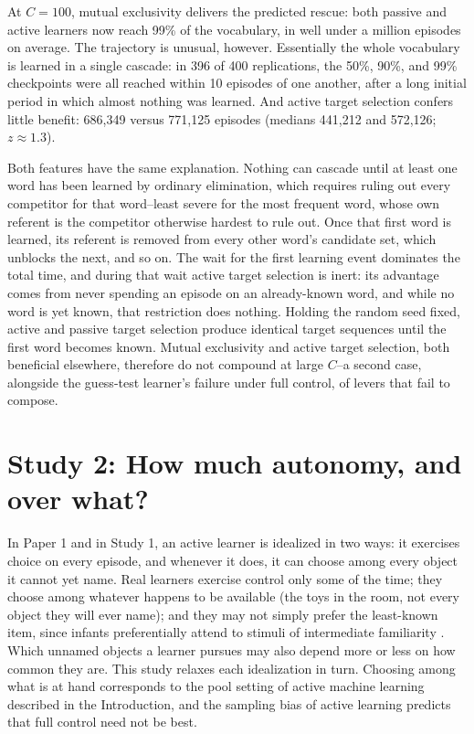 \documentclass[a4paper,natbib,man]{apa6}
\begin{document}
At $C=100$, mutual exclusivity delivers the predicted rescue: both passive and active learners now reach 99\% of the vocabulary, in well under a million episodes on average. The trajectory is unusual, however. Essentially the whole vocabulary is learned in a single cascade: in 396 of 400 replications, the 50\%, 90\%, and 99\% checkpoints were all reached within 10 episodes of one another, after a long initial period in which almost nothing was learned. And active target selection confers little benefit: 686,349 versus 771,125 episodes (medians 441,212 and 572,126; $z \approx 1.3$).

Both features have the same explanation. Nothing can cascade until at least one word has been learned by ordinary elimination, which requires ruling out every competitor for that word--least severe for the most frequent word, whose own referent is the competitor otherwise hardest to rule out. Once that first word is learned, its referent is removed from every other word's candidate set, which unblocks the next, and so on. The wait for the first learning event dominates the total time, and during that wait active target selection is inert: its advantage comes from never spending an episode on an already-known word, and while no word is yet known, that restriction does nothing. Holding the random seed fixed, active and passive target selection produce identical target sequences until the first word becomes known. Mutual exclusivity and active target selection, both beneficial elsewhere, therefore do not compound at large $C$--a second case, alongside the guess-test learner's failure under full control, of levers that fail to compose.

\section{Study 2: How much autonomy, and over what?}
\label{sec-modes}

In Paper 1 and in Study 1, an active learner is idealized in two ways: it exercises choice on every episode, and whenever it does, it can choose among every object it cannot yet name. Real learners exercise control only some of the time; they choose among whatever happens to be available (the toys in the room, not every object they will ever name); and they may not simply prefer the least-known item, since infants preferentially attend to stimuli of intermediate familiarity \citep[the ``Goldilocks effect'';][]{Kidd:2012}. Which unnamed objects a learner pursues may also depend more or less on how common they are. This study relaxes each idealization in turn. Choosing among what is at hand corresponds to the pool setting of active machine learning described in the Introduction, and the sampling bias of active learning predicts that full control need not be best.
\end{document}
